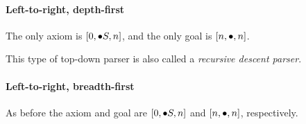 \paragraph{Left-to-right, depth-first}
The only axiom is $[0,\psep S, n]$, and the only goal is $[n,\psep,n]$.
%
\begin{prooftree}
\end{prooftree}
%
\begin{prooftree}
\end{prooftree}
%
This type of top-down parser is also called a \emph{recursive descent parser}.

\paragraph{Left-to-right, breadth-first}
As before the axiom and goal are $[0,\psep S,n]$ and $[n,\psep,n]$, respectively.
%
\begin{prooftree}
\end{prooftree}
%
\begin{prooftree}
\end{prooftree}

\begin{prooftree}
\end{prooftree}

